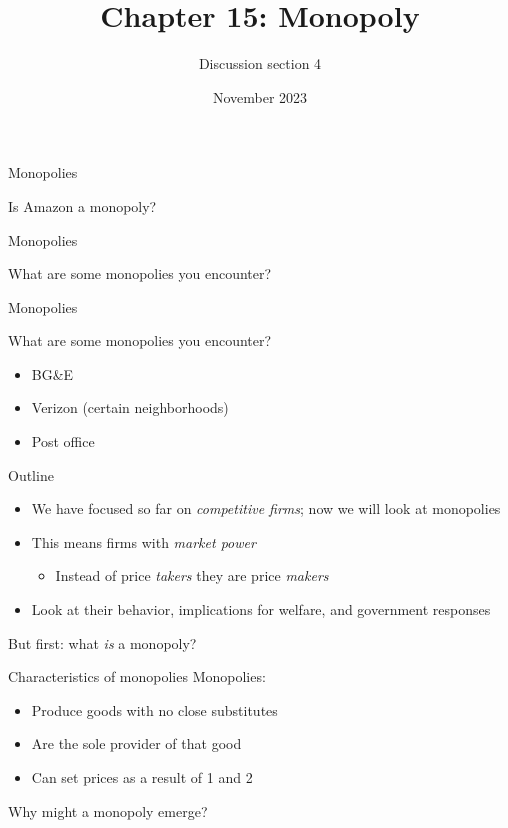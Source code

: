 \documentclass[aspectratio=169]{beamer}
\title{Chapter 15: Monopoly}
\author{Discussion section 4}
\date{November 2023}
\begin{document}
\begin{frame}
    \titlepage 
\end{frame}

\begin{frame}{Monopolies}
    \begin{center}
        Is Amazon a monopoly?
    \end{center}
\end{frame}

\begin{frame}{Monopolies}
        \begin{center}
            What are some monopolies you encounter?
        \end{center}
\end{frame}

\begin{frame}{Monopolies}
    \begin{center}
        What are some monopolies you encounter?
    \end{center}
    \begin{itemize}
        \item BG\&E
        \item Verizon (certain neighborhoods)
        \item Post office
    \end{itemize}
\end{frame}

\begin{frame}{Outline}
    \begin{itemize}
        \item We have focused so far on \textit{competitive firms}; now we will look at monopolies
        \item This means firms with \textit{market power}
        \begin{itemize}
            \item Instead of price \textit{takers} they are price \textit{makers}
        \end{itemize}
        \item Look at their behavior, implications for welfare, and government responses
    \end{itemize}

    \vspace{5mm}

    But first: what \textit{is} a monopoly?
\end{frame}

\begin{frame}{Characteristics of monopolies}
    Monopolies:
    \begin{itemize}
        \item Produce goods with no close substitutes
        \item Are the sole provider of that good
        \item Can set prices as a result of 1 and 2
    \end{itemize}

    \vspace{5mm}

    Why might a monopoly emerge?
\end{frame}
\end{document}

